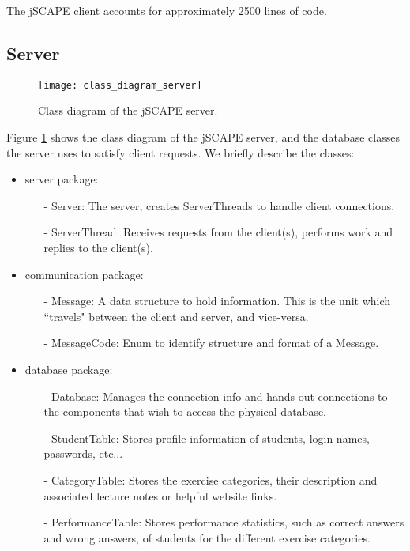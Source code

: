 The jSCAPE client accounts for approximately 2500 lines of code.

\subsection{Server}
\begin{figure}[H]
\centering
\texttt{[image: class\_diagram\_server]}
\caption{Class diagram of the jSCAPE server.}
\label{fig:class_diagram_server}
\end{figure}

Figure \ref{fig:class_diagram_server} shows the class diagram of the jSCAPE server, and the database classes the server uses to satisfy client requests. We briefly describe the classes:
\begin{itemize}
\item \textsf{server} package:
      \begin{itemize}
      \item[-] \textsf{Server}: The server, creates \textsf{ServerThread}s to handle client connections.
      \item[-] \textsf{ServerThread}: Receives requests from the client(s), performs work and replies to the client(s).
      \end{itemize}
\item \textsf{communication} package:
      \begin{itemize}
      \item[-] \textsf{Message}: A data structure to hold information. This is the unit which ``travels" between the client and server, and vice-versa.
      \item[-] \textsf{MessageCode}: Enum to identify structure and format of a \textsf{Message}.
      \end{itemize}     
\item \textsf{database} package:
      \begin{itemize}
      \item[-] \textsf{Database}: Manages the connection info and hands out connections to the components that wish to access the physical database.
      \item[-] \textsf{StudentTable}: Stores profile information of students, login names, passwords, etc...
      \item[-] \textsf{CategoryTable}: Stores the exercise categories, their description and associated lecture notes or helpful website links.
      \item[-] \textsf{PerformanceTable}: Stores performance statistics, such as correct answers and wrong answers, of students for the different exercise categories.

\end{itemize}
\end{itemize}
